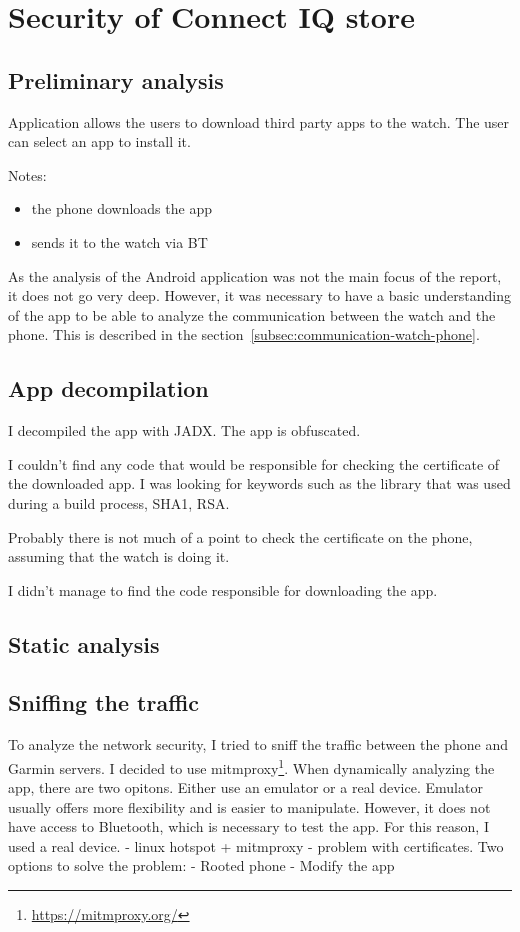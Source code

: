 \chapter{Security of Connect IQ store}
\section{Preliminary analysis}
Application allows the users to download third party apps to the watch.
The user can select an app to install it.

Notes:
\begin{itemize}
    \item the phone downloads the app
    \item sends it to the watch via BT
\end{itemize}

As the analysis of the Android application was not the main focus of the report, it does not go very deep.
However, it was necessary to have a basic understanding of the app to be able to analyze the communication between the watch and the phone.
This is described in the section~\ref{subsec:communication-watch-phone}.

\section{App decompilation}
I decompiled the app with JADX. The app is obfuscated.

I couldn't find any code that would be responsible for checking the certificate of the downloaded app.
I was looking for keywords such as the library that was used during a build process, SHA1, RSA\@.

Probably there is not much of a point to check the certificate on the phone, assuming that the watch is doing it.

I didn't manage to find the code responsible for downloading the app.
\section{Static analysis}

\section{Sniffing the traffic}
To analyze the network security, I tried to sniff the traffic between the phone and Garmin servers.
I decided to use mitmproxy\footnote{\url{https://mitmproxy.org/}}.
When dynamically analyzing the app, there are two opitons.
Either use an emulator or a real device.
Emulator usually offers more flexibility and is easier to manipulate.
However, it does not have access to Bluetooth, which is necessary to test the app.
For this reason, I used a real device.
- linux hotspot + mitmproxy - problem with certificates.
Two options to solve the problem:
- Rooted phone
- Modify the app

